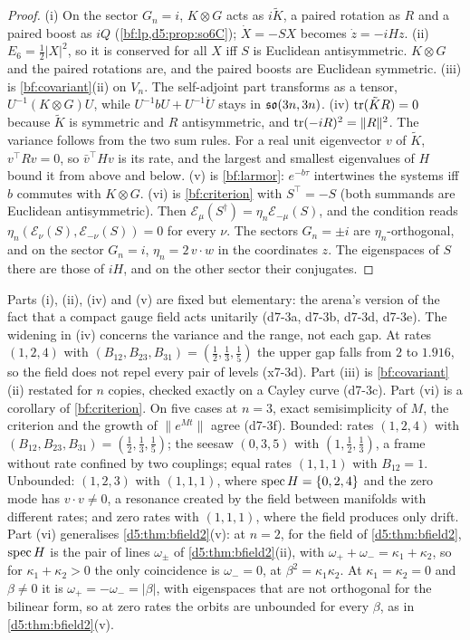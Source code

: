 \begin{proof}
(i) On the sector $G_n=i$, $K\otimes G$ acts as $i\tilde K$, a paired rotation as $R$ and a paired boost as $iQ$ (\cref{bf:lp,d5:prop:so6C}); $\dot X=-SX$ becomes $\dot z=-iHz$. (ii) $E_6=\tfrac12|X|^2$, so it is conserved for all $X$ iff $S$ is Euclidean
antisymmetric. $K\otimes G$ and the paired rotations are, and the paired boosts are Euclidean symmetric. (iii) is
\cref{bf:covariant}(ii) on $V_n$. The self-adjoint part transforms as a tensor, $U^{-1}(K\otimes G)U$, while $U^{-1}bU+U^{-1}\dot U$ stays in
$\mathfrak{so}(3n,3n)$. (iv) $\operatorname{tr}(\tilde KR)=0$ because $\tilde K$ is symmetric and $R$ antisymmetric, and $\operatorname{tr}(-iR)^2=\|R\|^2$. The variance follows from the two sum rules. For a real unit eigenvector $v$ of $\tilde K$, $v^{\top}Rv=0$, so $\bar v^{\top}Hv$ is its rate, and the largest and smallest eigenvalues of $H$ bound it from above and below. (v) is
\cref{bf:larmor}: $e^{-b\tau}$ intertwines the systems iff $b$ commutes with $K\otimes G$. (vi) is \cref{bf:criterion} with
$S^{\!\top}=-S$ (both summands are Euclidean antisymmetric). Then $\mathcal E_\mu(S^\dagger)=\eta_n\mathcal E_{-\mu}(S)$, and the condition reads
$\eta_n(\mathcal E_\nu(S),\mathcal E_{-\nu}(S))=0$ for every $\nu$. The sectors $G_n=\pm i$ are $\eta_n$-orthogonal, and on the sector $G_n=i$,
$\eta_n=2\,v\cdot w$ in the coordinates $z$. The eigenspaces of $S$ there are those of $iH$, and on the other sector their conjugates.
\end{proof}

Parts (i), (ii), (iv) and (v) are fixed but elementary: the arena's version of the fact that a compact gauge field acts unitarily
(d7-3a, d7-3b, d7-3d, d7-3e). The widening in (iv) concerns the variance and the range, not each gap. At rates $(1,2,4)$ with $(B_{12},B_{23},B_{31})=(\tfrac12,\tfrac13,\tfrac15)$ the upper gap falls from $2$ to $1.916$, so the field does not repel every pair of levels (x7-3d). Part (iii) is \cref{bf:covariant}(ii) restated for $n$ copies, checked exactly on a Cayley curve (d7-3c). Part (vi) is
a corollary of \cref{bf:criterion}. On five cases at $n=3$, exact semisimplicity of $M$, the criterion and the growth of $\|e^{Mt}\|$ agree
(d7-3f). Bounded: rates $(1,2,4)$ with $(B_{12},B_{23},B_{31})=(\tfrac12,\tfrac13,\tfrac15)$; the seesaw $(0,3,5)$ with $(1,\tfrac12,\tfrac13)$, a
frame without rate confined by two couplings; equal rates $(1,1,1)$ with $B_{12}=1$. Unbounded: $(1,2,3)$ with $(1,1,1)$, where $\operatorname{spec} H=\{0,2,4\}$ and the
zero mode has $v\cdot v\neq0$, a resonance created by the field between manifolds with different rates; and zero rates with $(1,1,1)$, where
the field produces only drift. Part (vi) generalises \cref{d5:thm:bfield2}(v): at $n=2$, for the field of \cref{d5:thm:bfield2}, $\operatorname{spec} H$ is the pair of lines $\omega_\pm$ of \cref{d5:thm:bfield2}(ii), with $\omega_++\omega_-=\kappa_1+\kappa_2$, so for $\kappa_1+\kappa_2>0$ the only coincidence
is $\omega_-=0$, at $\beta^2=\kappa_1\kappa_2$. At $\kappa_1=\kappa_2=0$ and $\beta\neq0$ it is $\omega_+=-\omega_-=|\beta|$, with eigenspaces that are not
orthogonal for the bilinear form, so at zero rates the orbits are unbounded for every $\beta$, as in \cref{d5:thm:bfield2}(v).

